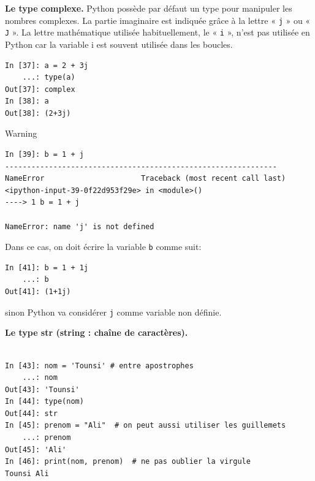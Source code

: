 \documentclass{beamer}
\begin{document}
\begin{frame}

\noindent\textbf{Le type complexe.}
Python possède par défaut un type pour manipuler les nombres complexes. La partie imaginaire est indiquée grâce à la lettre « \texttt{j} » ou « \texttt{J} ». La lettre mathématique utilisée habituellement, le « \texttt{i} », n’est pas utilisée en Python car la variable i est souvent utilisée dans les boucles.

\begin{verbatim}
In [37]: a = 2 + 3j
    ...: type(a)
Out[37]: complex
In [38]: a
Out[38]: (2+3j)
\end{verbatim}
\end{frame}

\begin{frame}

\begin{block}{Warning}
\begin{verbatim}
In [39]: b = 1 + j
--------------------------------------------------------------
NameError                      Traceback (most recent call last)
<ipython-input-39-0f22d953f29e> in <module>()
----> 1 b = 1 + j

NameError: name 'j' is not defined
\end{verbatim}
Dans ce cas, on doit écrire la variable \texttt{b} comme suit:
\begin{verbatim}
In [41]: b = 1 + 1j
    ...: b
Out[41]: (1+1j)
\end{verbatim}
sinon Python va considérer \texttt{j} comme variable non définie.
\end{block}
\end{frame}

\begin{frame}

\noindent\textbf{Le type str (string : chaîne de caractères).}
\begin{verbatim}

In [43]: nom = 'Tounsi' # entre apostrophes
    ...: nom
Out[43]: 'Tounsi'
In [44]: type(nom)
Out[44]: str
In [45]: prenom = "Ali"  # on peut aussi utiliser les guillemets
    ...: prenom
Out[45]: 'Ali'
In [46]: print(nom, prenom)  # ne pas oublier la virgule
Tounsi Ali
\end{verbatim}
\end{frame}
\end{document}

